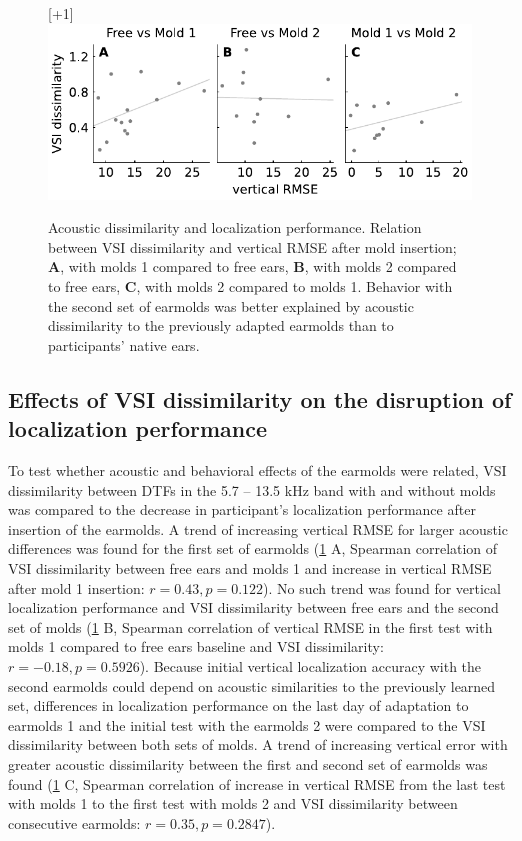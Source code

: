  \begin{figure}
\centering
    \raisebox{0pt}[\dimexpr\height+1\baselineskip\relax]{
        \includegraphics[width=12cm]{../Results/figures/fig6/fig6}}
	\caption{Acoustic dissimilarity and localization performance. Relation between VSI dissimilarity and vertical RMSE after mold insertion; \textbf{A}, with molds 1 compared to free ears, \textbf{B}, with molds 2 compared to free ears, \textbf{C}, with molds 2 compared to molds 1. Behavior with the second set of earmolds was better explained by acoustic dissimilarity to the previously adapted earmolds than to participants' native ears.}
	\label{fig:vsi_dis_rmse}
\end{figure}
\noindent%

\subsection{Effects of VSI dissimilarity on the disruption of localization performance}

To test whether acoustic and behavioral effects of the earmolds were related, VSI dissimilarity between DTFs in the 5.7 – 13.5 kHz band with and without molds was compared to the decrease in participant’s localization performance after insertion of the earmolds. A trend of increasing vertical RMSE for larger acoustic differences was found for the first set of earmolds (\cref{fig:vsi_dis_rmse} A, Spearman correlation of VSI dissimilarity between free ears and molds 1 and increase in vertical RMSE after mold 1 insertion: $r = 0.43, p = 0.122$). No such trend was found for vertical localization performance and VSI dissimilarity between free ears and the second set of molds (\cref{fig:vsi_dis_rmse} B, Spearman correlation of vertical RMSE in the first test with molds 1 compared to free ears baseline and VSI dissimilarity: $r = - 0.18, p = 0.5926$). Because initial vertical localization accuracy with the second earmolds could depend on acoustic similarities to the previously learned set, differences in localization performance on the last day of adaptation to earmolds 1 and the initial test with the earmolds 2 were compared to the VSI dissimilarity between both sets of molds. A trend of increasing vertical error with greater acoustic dissimilarity between the first and second set of earmolds was found (\cref{fig:vsi_dis_rmse} C, Spearman correlation of increase in vertical RMSE from the last test with molds 1 to the first test with molds 2 and VSI dissimilarity between consecutive earmolds: $r = 0.35, p = 0.2847$). 

